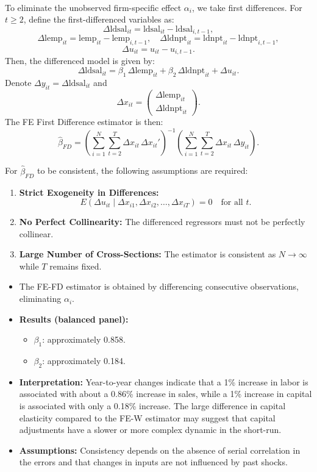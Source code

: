 \documentclass[a4paper,12pt]{article} %
\theoremstyle{nonitalic}
\newenvironment{solution}[1]
  {\renewcommand\theinnercustomsol{#1}\innercustomsol}
  {\endinnercustomsol}
\newcounter{solutionctr}
\renewcommand{\thesolutionctr}{(\alph{solutionctr})}
\newenvironment{autosolution}
  {\stepcounter{solutionctr}\begin{solution}{\thesolutionctr}}
  {\end{solution}}
\begin{document}
\begin{autosolution}
\

To eliminate the unobserved firm-specific effect \(\alpha_i\), we take first differences. For \(t \geq 2\), define the first-differenced variables as:
\[
\Delta \text{ldsal}_{it} = \text{ldsal}_{it} - \text{ldsal}_{i,t-1},
\]
\[
\Delta \text{lemp}_{it} = \text{lemp}_{it} - \text{lemp}_{i,t-1}, \quad \Delta \text{ldnpt}_{it} = \text{ldnpt}_{it} - \text{ldnpt}_{i,t-1},
\]
\[
\Delta u_{it} = u_{it} - u_{i,t-1}.
\]
Then, the differenced model is given by:
\[
\Delta \text{ldsal}_{it} = \beta_1\,\Delta \text{lemp}_{it} + \beta_2\,\Delta \text{ldnpt}_{it} + \Delta u_{it}.
\]
Denote \(\Delta y_{it} = \Delta \text{ldsal}_{it}\) and
\[
\Delta x_{it} = \begin{pmatrix} \Delta \text{lemp}_{it} \\ \Delta \text{ldnpt}_{it} \end{pmatrix}.
\]
The FE First Difference estimator is then:
\[
\hat{\beta}_{FD} = \left( \sum_{i=1}^{N}\sum_{t=2}^{T} \Delta x_{it}\,\Delta x_{it}' \right)^{-1}\left( \sum_{i=1}^{N}\sum_{t=2}^{T} \Delta x_{it}\,\Delta y_{it} \right).
\]

For \(\hat{\beta}_{FD}\) to be consistent, the following assumptions are required:
\begin{enumerate}
    \item \textbf{Strict Exogeneity in Differences:}  
    \[
    E\left(\Delta u_{it} \mid \Delta x_{i1}, \Delta x_{i2}, \dots, \Delta x_{iT}\right) = 0 \quad \text{for all } t.
    \]
    \item \textbf{No Perfect Collinearity:} The differenced regressors must not be perfectly collinear.
    \item \textbf{Large Number of Cross-Sections:} The estimator is consistent as \(N \to \infty\) while \(T\) remains fixed.
\end{enumerate}


\begin{itemize}
    \item The FE-FD estimator is obtained by differencing consecutive observations, eliminating $\alpha_i$.
    \item \textbf{Results (balanced panel):}
    \begin{itemize}
        \item $\beta_1$: approximately 0.858.
        \item $\beta_2$: approximately 0.184.
    \end{itemize}
    \item \textbf{Interpretation:} Year-to-year changes indicate that a 1\% increase in labor is associated with about a 0.86\% increase in sales, while a 1\% increase in capital is associated with only a 0.18\% increase. The large difference in capital elasticity compared to the FE-W estimator may suggest that capital adjustments have a slower or more complex dynamic in the short-run.
    \item \textbf{Assumptions:} Consistency depends on the absence of serial correlation in the errors and that changes in inputs are not influenced by past shocks.
\end{itemize}
\end{autosolution}
\end{document}
